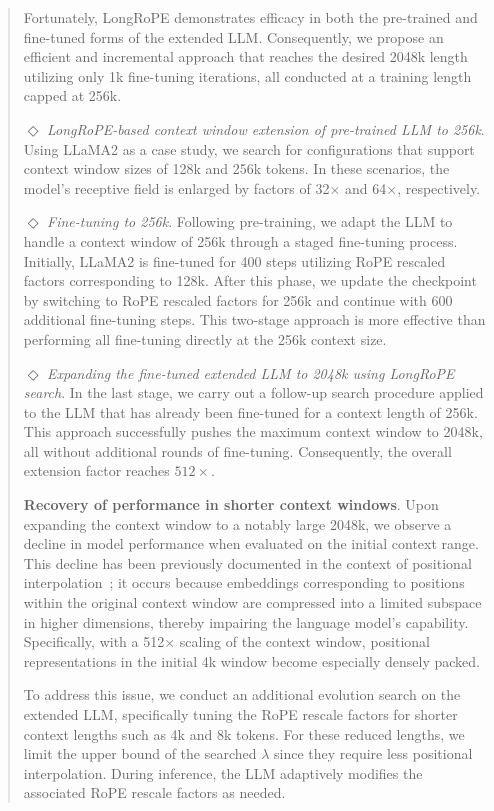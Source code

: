 \begin{abstract}
Fortunately, LongRoPE demonstrates efficacy in both the pre-trained and fine-tuned forms of the extended LLM. Consequently, we propose an efficient and incremental approach that reaches the desired 2048k length utilizing only 1k fine-tuning iterations, all conducted at a training length capped at 256k.

$\Diamond$ \textit{LongRoPE-based context window extension of pre-trained LLM to 256k}. Using LLaMA2 as a case study, we search for configurations that support context window sizes of 128k and 256k tokens. In these scenarios, the model’s receptive field is enlarged by factors of 32$\times$ and 64$\times$, respectively.

$\Diamond$ \textit{Fine-tuning to 256k}. Following pre-training, we adapt the LLM to handle a context window of 256k through a staged fine-tuning process. Initially, LLaMA2 is fine-tuned for 400 steps utilizing RoPE rescaled factors corresponding to 128k. After this phase, we update the checkpoint by switching to RoPE rescaled factors for 256k and continue with 600 additional fine-tuning steps. This two-stage approach is more effective than performing all fine-tuning directly at the 256k context size.

$\Diamond$ \textit{Expanding the fine-tuned extended LLM to 2048k using LongRoPE search}. In the last stage, we carry out a follow-up search procedure applied to the LLM that has already been fine-tuned for a context length of 256k. This approach successfully pushes the maximum context window to 2048k, all without additional rounds of fine-tuning. Consequently, the overall extension factor reaches $512\times$.

\textbf{Recovery of performance in shorter context windows}. Upon expanding the context window to a notably large 2048k, we observe a decline in model performance when evaluated on the initial context range. This decline has been previously documented in the context of positional interpolation~\cite{pi}; it occurs because embeddings corresponding to positions within the original context window are compressed into a limited subspace in higher dimensions, thereby impairing the language model's capability. Specifically, with a 512$\times$ scaling of the context window, positional representations in the initial 4k window become especially densely packed.

To address this issue, we conduct an additional evolution search on the extended LLM, specifically tuning the RoPE rescale factors for shorter context lengths such as 4k and 8k tokens. For these reduced lengths, we limit the upper bound of the searched $\lambda$ since they require less positional interpolation. During inference, the LLM adaptively modifies the associated RoPE rescale factors as needed.


\end{abstract}
